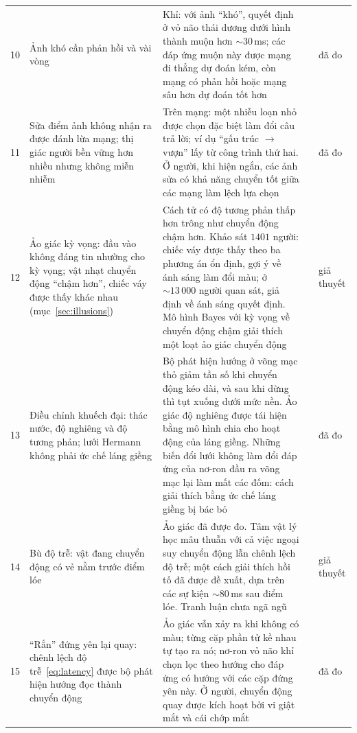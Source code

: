 {\begin{longtable}{>{\raggedright}p{0.5cm}>{\raggedright}p{4.0cm}>{\raggedright}p{5.6cm}>{\raggedright}p{2.3cm}>{\raggedright\arraybackslash}p{1.7cm}}
10 & Ảnh khó cần phản hồi và vài vòng & Khỉ: với ảnh ``khó'', quyết định ở vỏ não thái dương dưới hình thành muộn hơn $\sim30$\,ms; các đáp ứng muộn này được mạng đi thẳng dự đoán kém, còn mạng có phản hồi hoặc mạng sâu hơn dự đoán tốt hơn & \cite{Kar2019} & đã đo \\
11 & Sửa điểm ảnh không nhận ra được đánh lừa mạng; thị giác người bền vững hơn nhiều nhưng không miễn nhiễm & Trên mạng: một nhiễu loạn nhỏ được chọn đặc biệt làm đổi câu trả lời; ví dụ ``gấu trúc $\to$ vượn'' lấy từ công trình thứ hai. Ở người, khi hiện ngắn, các ảnh sửa có khả năng chuyển tốt giữa các mạng làm lệch lựa chọn & \cite{Szegedy2014,Goodfellow2015,Elsayed2018} & đã đo \\
12 & Ảo giác kỳ vọng: đầu vào không đáng tin nhường cho kỳ vọng; vật nhạt chuyển động ``chậm hơn'', chiếc váy được thấy khác nhau (mục~\ref{sec:illusions}) & Cách tử có độ tương phản thấp hơn trông như chuyển động chậm hơn. Khảo sát $1401$ người: chiếc váy được thấy theo ba phương án ổn định, gợi ý về ánh sáng làm đổi màu; ở $\sim13\,000$ người quan sát, giả định về ánh sáng quyết định. Mô hình Bayes với kỳ vọng về chuyển động chậm giải thích một loạt ảo giác chuyển động & \cite{Thompson1982,LaferSousa2015,Wallisch2017,Weiss2002,Purves2011} & giả thuyết \\
13 & Điều chỉnh khuếch đại: thác nước, độ nghiêng và độ tương phản; lưới Hermann không phải ức chế láng giềng & Bộ phát hiện hướng ở võng mạc thỏ giảm tần số khi chuyển động kéo dài, và sau khi dừng thì tụt xuống dưới mức nền. Ảo giác độ nghiêng được tái hiện bằng mô hình chia cho hoạt động của láng giềng. Những biến đổi lưới không làm đổi đáp ứng của nơ-ron đầu ra võng mạc lại làm mất các đốm: cách giải thích bằng ức chế láng giềng bị bác bỏ & \cite{BarlowHill1963,Schwartz2009,SchillerCarvey2005} & đã đo \\
14 & Bù độ trễ: vật đang chuyển động có vẻ nằm trước điểm lóe & Ảo giác đã được đo. Tâm vật lý học mâu thuẫn với cả việc ngoại suy chuyển động lẫn chênh lệch độ trễ; một cách giải thích hồi tố đã được đề xuất, dựa trên các sự kiện $\sim80$\,ms sau điểm lóe. Tranh luận chưa ngã ngũ & \cite{Nijhawan1994,EaglemanSejnowski2000} & giả thuyết \\
15 & ``Rắn'' đứng yên lại quay: chênh lệch độ trễ~\eqref{eq:latency} được bộ phát hiện hướng đọc thành chuyển động & Ảo giác vẫn xảy ra khi không có màu; từng cặp phần tử kề nhau tự tạo ra nó; nơ-ron vỏ não khỉ chọn lọc theo hướng cho đáp ứng có hướng với các cặp đứng yên này. Ở người, chuyển động quay được kích hoạt bởi vi giật mắt và cái chớp mắt & \cite{Conway2005,OteroMillan2012} & đã đo \\

\end{longtable}}
